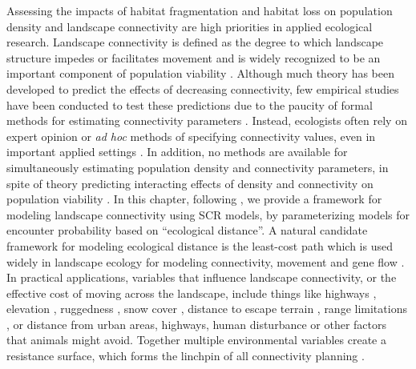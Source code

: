 Assessing the impacts of habitat fragmentation and habitat loss on
population density and landscape connectivity are high priorities in
applied ecological research.  Landscape connectivity is defined as the
degree to which landscape structure impedes or facilitates movement
\citep{tischendorf_fahrig:2000} and is widely recognized to be an
important component of population viability
\citep{with_crist:1995}. Although much theory has been developed to
predict the effects of decreasing connectivity, few empirical studies
have been conducted to test these predictions due to the paucity of
formal methods for estimating connectivity parameters
\citep{cushman_etal:2010}. Instead, ecologists often rely on expert
opinion or \textit{ad hoc} methods of specifying connectivity values,
even in important applied settings
\citep{adriaensen_etal:2003,beier_etal:2008,zeller_etal:2012}. In
addition, no methods are available for simultaneously estimating
population density and connectivity parameters, in spite of theory
predicting interacting effects of density and connectivity on
population viability \citep{tischendorf_etal:2005,cushman_etal:2010}.
In this chapter, following \citet{royle_etal:2012ecol}, we provide a
framework for modeling landscape connectivity using SCR models, by
parameterizing models for encounter probability based on ``ecological
distance''.  A natural candidate framework for modeling ecological
distance is the least-cost path which is used widely in landscape
ecology for modeling connectivity, movement and gene flow
\citep{adriaensen_etal:2003,manel_etal:2003,mcrae_etal:2008}.  In
practical applications, variables that influence landscape
connectivity, or the effective cost of moving across the landscape,
include things like highways \citep[e.g.,][]{epps_etal:2005},
elevation \citep{cushman_etal:2006}, ruggedness
\citep{epps_etal:2007}, snow cover \citep{schwartz_etal:2009},
distance to escape terrain \citep{shirk_etal:2010}, range limitations
\citep{mcrae_beier:2007}, or distance from urban areas, highways,
human disturbance or other factors that animals might avoid.  Together
multiple environmental variables create a resistance surface, which
forms the linchpin of all connectivity planning
\citep{spear_etal:2010}.

